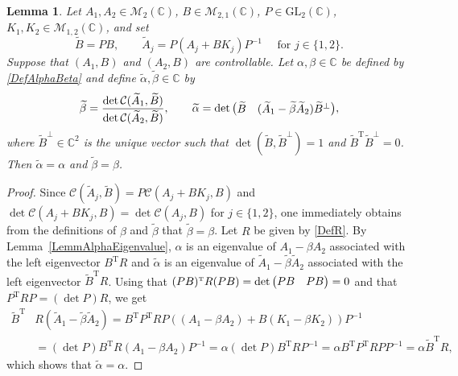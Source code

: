 \documentclass[10pt]{amsart}
\renewenvironment{bmatrix}{\bigl(\begin{matrix}}{\end{matrix}\bigr)}
\theoremstyle{plain}
\newtheorem{lemm}[theo]{Lemma}
\theoremstyle{definition}
\newcommand{\transp}{{\scriptscriptstyle\mathrm{T}}}
\begin{document}
\begin{lemm}
\label{LemmAlphaBetaInvariant}
Let $A_1, A_2 \in \mathcal M_2(\mathbb C)$, $B \in \mathcal M_{2, 1}(\mathbb C)$, $P \in \mathrm{GL}_2(\mathbb C)$, $K_1, K_2 \in \mathcal M_{1, 2}(\mathbb C)$, and set
\[
\widetilde B = P B, \qquad \widetilde A_j = P (A_j + B K_j) P^{-1} \quad \text{ for } j \in \{1, 2\}.
\]
Suppose that $(A_1, B)$ and $(A_2, B)$ are controllable. Let $\alpha, \beta \in \mathbb C$ be defined by \eqref{DefAlphaBeta} and define $\widetilde\alpha, \widetilde\beta \in \mathbb C$ by
\[
\widetilde\beta = \frac{\det \mathcal C(\widetilde A_1, \widetilde B)}{\det \mathcal C(\widetilde A_2, \widetilde B)}, \qquad \widetilde\alpha = \det \begin{bmatrix}\widetilde B & (\widetilde A_1 - \widetilde \beta \widetilde A_2) \widetilde B^\perp\end{bmatrix},
\]
where $\widetilde B^\perp \in \mathbb C^2$ is the unique vector such that $\det(\widetilde B, \widetilde B^\perp) = 1$ and $\widetilde B^\transp \widetilde B^\perp = 0$. Then $\widetilde\alpha = \alpha$ and $\widetilde\beta = \beta$.
\end{lemm}

\begin{proof}
Since $\mathcal C(\widetilde A_j, \widetilde B) = P \mathcal C(A_j + B K_j, B)$ and $\det \mathcal C(A_j + B K_j, B) = \det \mathcal C(A_j, B)$ for $j \in \{1, 2\}$, one immediately obtains from the definitions of $\beta$ and $\widetilde\beta$ that $\widetilde\beta = \beta$. Let $R$ be given by \eqref{DefR}. By Lemma~\ref{LemmAlphaEigenvalue}, $\alpha$ is an eigenvalue of $A_1 - \beta A_2$ associated with the left eigenvector $B^\transp R$ and $\widetilde\alpha$ is an eigenvalue of $\widetilde A_1 - \widetilde\beta \widetilde A_2$ associated with the left eigenvector $\widetilde B^\transp R$. Using that $(P B)^\transp R (P B) = \det\begin{bmatrix}PB & PB\\\end{bmatrix} = 0$ and that $P^\transp R P = (\det P) R$, we get
\begin{align*}
\widetilde B^\transp &R (\widetilde A_1 - \widetilde\beta \widetilde A_2)  = B^\transp P^\transp R P \left((A_1 - \beta A_2) + B(K_1 - \beta K_2)\right) P^{-1}\\
&= (\det P) B^\transp R (A_1 - \beta A_2) P^{-1}
= \alpha (\det P) B^\transp R P^{-1} = \alpha B^\transp P^\transp R P P^{-1} = \alpha \widetilde B^\transp R,
\end{align*}
which shows that $\widetilde\alpha = \alpha$.
\end{proof}
\end{document}
